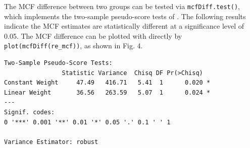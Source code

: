 The MCF difference between two groups can be tested via
\texttt{mcfDiff.test()}, which implements the two-sample pseudo-score
tests of \citep{cook1996biometrics}. The following results indicate the
MCF estimates are statistically different at a significance level of
0.05. The MCF difference can be plotted with directly by
\texttt{plot(mcfDiff(re\_mcf))}, as shown in Fig. 4.

\begin{Shaded}
\begin{Highlighting}[]
\OperatorTok{::}
\end{Highlighting}
\end{Shaded}

\begin{verbatim}
Two-Sample Pseudo-Score Tests:
                Statistic Variance  Chisq DF Pr(>Chisq)  
Constant Weight     47.49   416.71   5.41  1      0.020 *
Linear Weight       36.56   263.59   5.07  1      0.024 *
---
Signif. codes:  
0 '***' 0.001 '**' 0.01 '*' 0.05 '.' 0.1 ' ' 1

Variance Estimator: robust 
\end{verbatim}
